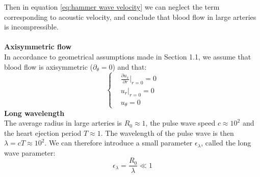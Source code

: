 \documentclass[12pt,a4paper]{article}
\numberwithin{equation}{section}
\begin{document}
Then in equation \ref{eq:hammer wave velocity} we can neglect the term corresponding to acoustic velocity, and conclude that blood flow in large arteries is incompressible.\\
\\
{\bf Axisymmetric flow}\\
In accordance to geometrical assumptions made in Section 1.1, we assume that blood flow is axisymmetric ($\partial_\theta = 0$) and that:
\begin{equation}
  \left\{
      \begin{aligned}
       & \frac{\partial u_x}{\partial r} \bigg|_{r=0} = 0\\
       & u_r \big|_{r=0}=0\\
       & u_\theta =0
      \end{aligned}
    \right.
\end{equation}
{\bf Long wavelength}\\
The average radius in large arteries is $R_0 \approx 1$, the pulse wave speed $c \approx 10^2$ and the heart ejection period $T \approx 1$. The wavelength of the pulse wave is then $ \lambda = cT \approx 10^2$. We can therefore introduce a small parameter $\epsilon_\lambda$, called the long wave parameter:
\begin{equation} \label{eq:long wave hypothesis}
\epsilon_\lambda = \frac{R_0}{\lambda} \ll 1
\end{equation}
\end{document}
